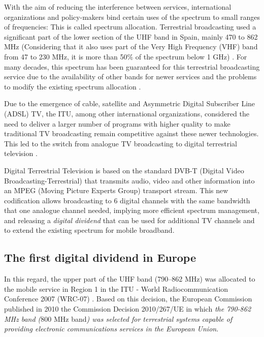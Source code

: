 
With the aim of reducing the interference between services, international organizations and policy-makers bind certain uses of the spectrum to small ranges of frequencies: This is called spectrum allocation. Terrestrial broadcasting used a significant part of the lower section of the UHF band in Spain, mainly 470 to 862 MHz (Considering that it also uses part of the Very High Frequency (VHF) band from 47 to 230 MHz, it is more than 50$\%$  of the spectrum below 1 GHz) \cite{1-02}. For many decades, this spectrum has been guaranteed for this terrestrial broadcasting service due to the availability of other bands for newer services and the problems to modify the existing spectrum allocation \cite{1-03}.\par

Due to the emergence of cable, satellite and Asymmetric Digital Subscriber Line (ADSL) TV, the ITU, among other international organizations, considered the need to deliver a larger number of programs with higher quality to make traditional TV broadcasting remain competitive against these newer technologies. This led to the switch from analogue TV broadcasting to digital terrestrial television \cite{1-03}.\par

Digital Terrestrial Television is based on the standard DVB-T (Digital Video Broadcasting-Terrestrial) that transmits audio, video and other information into an MPEG (Moving Picture Experts Group) transport stream. This new codification allows broadcasting to 6 digital channels with the same bandwidth that one analogue channel needed, implying more efficient spectrum management, and releasing a \textit{digital dividend} that can be used for additional TV channels and to extend the existing spectrum for mobile broadband.\par

\subsection*{The first digital dividend in Europe}
In this regard, the upper part of the UHF band (790–862 MHz) was allocated to the mobile service in Region 1 in the ITU - World Radiocommunication Conference 2007 (WRC-07) \cite{1-04}. Based on this decision, the European Commission published in 2010 the Commission Decision 2010/267/UE \cite{1-05} in which \textit{\guillemotleft the 790-862 MHz band (}800 MHz band\textit{) was selected for terrestrial systems capable of providing electronic communications services in the European Union}\guillemotright .\par

